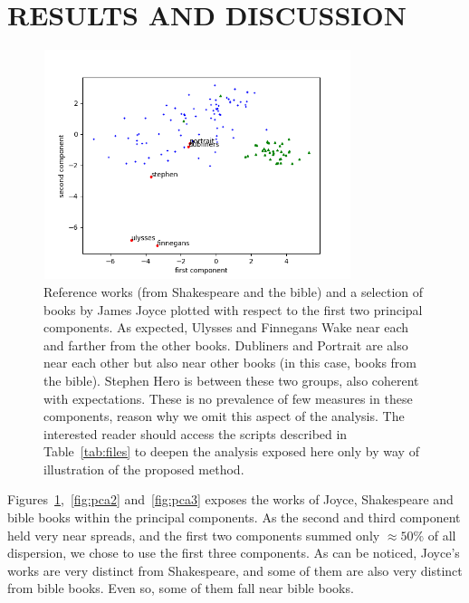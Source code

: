 \documentclass[12pt,fleqn]{article}
\begin{document}
\section{RESULTS AND DISCUSSION}\label{sec:res}

\begin{figure}[!htbp] %
\vspace{-2pt}
\begin{center}
\includegraphics[height=6.7cm,width=9cm]{figs/pca}%
    \caption{Reference works (from Shakespeare and the bible) and a selection of books by James Joyce plotted with respect to the first two principal components.
    As expected, Ulysses and Finnegans Wake near each and farther from the other books. Dubliners and Portrait are also near each other but also near other books (in this case, books from the bible).
    Stephen Hero is between these two groups, also coherent with expectations.
    These is no prevalence of few measures in these components, reason why we omit this aspect of the analysis.
    The interested reader should access the scripts described in Table~\ref{tab:files} to deepen the analysis exposed here only by way of illustration of the proposed method.}
\label{fig:pca1}%
\end{center}
\end{figure}

Figures~\ref{fig:pca1},~\ref{fig:pca2} and~\ref{fig:pca3} exposes the works of Joyce,
Shakespeare and bible books within the principal components.
As the second and third component held very near spreads,
and the first two components summed only $\approx 50\%$ of all dispersion,
we chose to use the first three components.
As can be noticed, Joyce's works are very distinct from Shakespeare,
and some of them are also very distinct from bible books.
Even so, some of them fall near bible books.
\end{document}
